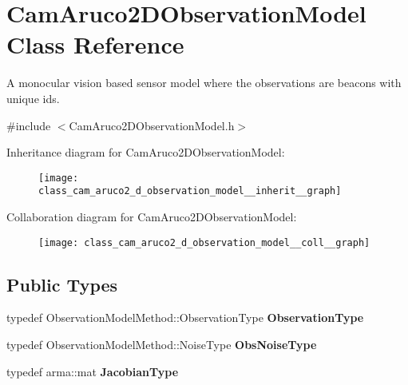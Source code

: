 \hypertarget{class_cam_aruco2_d_observation_model}{\section{\-Cam\-Aruco2\-D\-Observation\-Model \-Class \-Reference}
\label{class_cam_aruco2_d_observation_model}
}


\-A monocular vision based sensor model where the observations are beacons with unique ids.  




{\ttfamily \#include $<$\-Cam\-Aruco2\-D\-Observation\-Model.\-h$>$}



\-Inheritance diagram for \-Cam\-Aruco2\-D\-Observation\-Model\-:\nopagebreak
\begin{figure}[H]
\begin{center}
\leavevmode
\texttt{[image: class\_cam\_aruco2\_d\_observation\_model\_\_inherit\_\_graph]}
\end{center}
\end{figure}


\-Collaboration diagram for \-Cam\-Aruco2\-D\-Observation\-Model\-:\nopagebreak
\begin{figure}[H]
\begin{center}
\leavevmode
\texttt{[image: class\_cam\_aruco2\_d\_observation\_model\_\_coll\_\_graph]}
\end{center}
\end{figure}
\subsection*{\-Public \-Types}
\begin{DoxyCompactItemize}
\item 
\hypertarget{class_cam_aruco2_d_observation_model_a227cf56e4ad62f5fec7c88b5b8c5a403}{typedef \*
\-Observation\-Model\-Method\-::\-Observation\-Type {\bfseries \-Observation\-Type}}\label{class_cam_aruco2_d_observation_model_a227cf56e4ad62f5fec7c88b5b8c5a403}

\item 
\hypertarget{class_cam_aruco2_d_observation_model_a45378bb9e9708b75b6d7cea400c4e179}{typedef \*
\-Observation\-Model\-Method\-::\-Noise\-Type {\bfseries \-Obs\-Noise\-Type}}\label{class_cam_aruco2_d_observation_model_a45378bb9e9708b75b6d7cea400c4e179}

\item 
\hypertarget{class_cam_aruco2_d_observation_model_aabb4595d4a78f07033daee230dd3b7e8}{typedef arma\-::mat {\bfseries \-Jacobian\-Type}}\label{class_cam_aruco2_d_observation_model_aabb4595d4a78f07033daee230dd3b7e8}

\end{DoxyCompactItemize}
